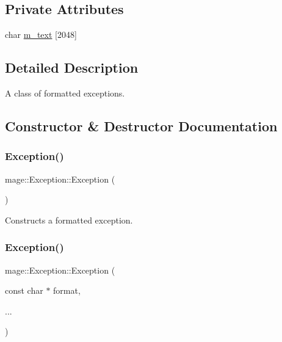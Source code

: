 \subsection*{Private Attributes}
\begin{DoxyCompactItemize}
\item 
char \hyperlink{classmage_1_1_exception_a11062fc70be58cf87faf2e1f8a4bebe7}{m\+\_\+text} \mbox{[}2048\mbox{]}
\end{DoxyCompactItemize}


\subsection{Detailed Description}
A class of formatted exceptions. 

\subsection{Constructor \& Destructor Documentation}
\hypertarget{classmage_1_1_exception_a87fd5f6c5465c01244020afbaebdb9f5}{}\label{classmage_1_1_exception_a87fd5f6c5465c01244020afbaebdb9f5} 
\subsubsection{\texorpdfstring{Exception()}{Exception()}\hspace{0.1cm}{\footnotesize\ttfamily [1/5]}}
{\footnotesize\ttfamily mage\+::\+Exception\+::\+Exception (\begin{DoxyParamCaption}{ }\end{DoxyParamCaption})}

Constructs a formatted exception. \hypertarget{classmage_1_1_exception_a140a96da55e56931ecd1f0e1adb69f00}{}\label{classmage_1_1_exception_a140a96da55e56931ecd1f0e1adb69f00} 
\subsubsection{\texorpdfstring{Exception()}{Exception()}\hspace{0.1cm}{\footnotesize\ttfamily [2/5]}}
{\footnotesize\ttfamily mage\+::\+Exception\+::\+Exception (\begin{DoxyParamCaption}\item[{const char $\ast$}]{format,  }\item[{}]{... }\end{DoxyParamCaption})\hspace{0.3cm}{\ttfamily [explicit]}}


